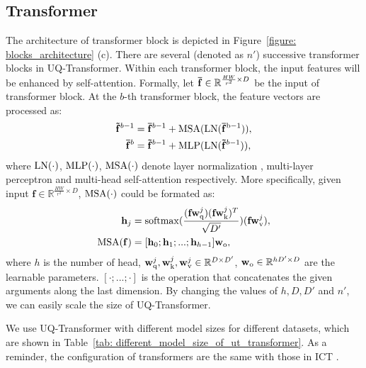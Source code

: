 \documentclass[10pt,twocolumn,letterpaper]{article}
\newcommand{\Tref}[1]{Table~\ref{#1}}
\newcommand{\Fref}[1]{Figure~\ref{#1}}
\begin{document}
\subsection{Transformer}
The architecture of transformer block is depicted in \Fref{figure: blocks_architecture} (c).  There are several (denoted as $n'$) successive transformer blocks in UQ-Transformer. Within each transformer block, the input features will be enhanced by self-attention. Formally, let $\mathbf{\Bar{f}} \in \mathbb{R}^{\frac{HW}{r^2} \times D}$ be the input of transformer block.
At the $b$-th transformer block, the feature vectors are processed as:
\begin{equation}
\begin{aligned}
    \mathbf{\tilde{f}}^{b-1} & = \mathbf{\Bar{f}}^{b-1} + {\rm MSA}({\rm{LN}(\mathbf{\Bar{f}}^{b-1})}), \\
    \mathbf{\Bar{f}}^{b} & = \mathbf{\tilde{f}}^{b-1} + {\rm MLP}({\rm LN}(\mathbf{\tilde{f}}^{b-1})),
\end{aligned}
\label{eq: transformer_block}
\end{equation}
where ${\rm LN}(\cdot)$, ${\rm MLP}(\cdot)$, ${\rm MSA}(\cdot)$ denote layer normalization \cite{ba2016layer}, multi-layer perceptron and multi-head self-attention respectively. More specifically, given input $\mathbf{f}\in \mathbb{R}^{\frac{HW}{r^2} \times D}$, ${\rm MSA}(\cdot)$ could be formated as:
\begin{equation}
\begin{aligned}
    \mathbf{h}_{j} & = {\rm softmax}(\frac{(\mathbf{fw}_{\rm q}^{j})(\mathbf{fw}_{\rm k}^{j})^T}{\sqrt{D'}})(\mathbf{fw}_{\rm v}^{j}), \\
    {\rm MSA}(\mathbf{f}) & = [\mathbf{h}_0; \mathbf{h}_1;...;\mathbf{h}_{h-1}]\mathbf{w}_{\rm o},
\end{aligned}
\label{eq: multi_head_self_attention}
\end{equation}
where $h$ is the number of head, $\mathbf{w}_{\rm q}^{j}, \mathbf{w}_{\rm k}^{j}, \mathbf{w}_{\rm v}^{j} \in \mathbb{R}^{D \times D'}$, $\mathbf{w}_{\rm o} \in \mathbb{R}^{hD' \times D}$ are the learnable parameters. $[\cdot;...;\cdot]$ is the operation that concatenates the given arguments along the last dimension. By changing the values of $h, D, D'$ and $n'$, we can easily scale the size of UQ-Transformer.

We use UQ-Transformer with different model sizes for different datasets, which are shown in \Tref{tab: different_model_size_of_ut_transformer}. As a reminder, the configuration of transformers are the same with those in ICT \cite{wan2021high}.
\end{document}
